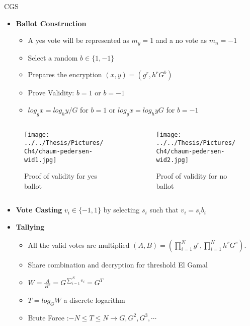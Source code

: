 \documentclass{beamer}
\begin{document}
\begin{frame}[allowframebreaks]{CGS}

\begin{itemize}
\item \textbf{Ballot Construction} 

\begin{itemize}
\item A yes vote will be represented as $m_y=1$ and a no vote as $m_n=-1$
\item Select a random $b \in \{1,-1\}$
\item Prepares the encryption $(x,y) = (g^r, h^r G^b)$
\item Prove Validity: $b=1$ or $b=-1$
\item $log_g x = log_h y/G$ for $b=1$ or $log_g x = log_h yG$ for $b=-1$
\end{itemize}
\end{itemize}

\framebreak

\begin{columns}
\begin{column}{0.5\textwidth}
\begin{figure}[htbp]

\texttt{[image: ../../Thesis/Pictures/Ch4/chaum-pedersen-wid1.jpg]} 
\caption{Proof of validity for yes ballot}
\label{fig:cpwid1}
\end{figure}
\end{column}

\begin{column}{0.5\textwidth}
\begin{figure}[htbp]
\texttt{[image: ../../Thesis/Pictures/Ch4/chaum-pedersen-wid2.jpg]} 
\caption{Proof of validity for no ballot}
\label{fig:cpwid-1}
\end{figure}
\end{column}

\end{columns}

\framebreak

\begin{itemize}
\item \textbf{Vote Casting}   $v_i \in \{ -1, 1 \}$ by selecting $s_i$ such that $v_i = s_i b_i$  
\item \textbf{Tallying}
\begin{itemize}
\item All the valid votes are   multiplied  $(A,B) = (\prod_{i=1}^N g^{r}, \prod_{i=1}^N h^{r} G^v)$. 
\item Share combination and decryption for threshold El Gamal
\item $W = \frac{A}{B^x} = G^{ \sum_{i=1}^N v_i} = G^{T}$
\item $T= log_G W$ a discrete logarithm
\item Brute Force :$-N \leq T \leq N \rightarrow G,G^2,G^3, \cdots$
\end{itemize}

\end{itemize}
\end{frame}
\end{document}
